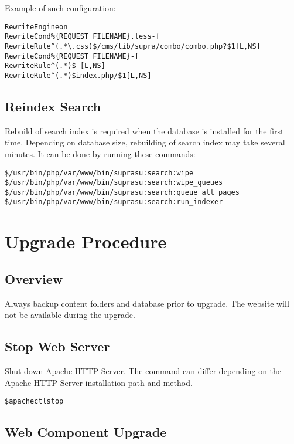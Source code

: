 \documentclass[12pt]{article}
\newcommand{\vigPathToProject}{/var/www}
\begin{document}
Example of such configuration:

\begin{alltt}
RewriteEngine on
RewriteCond \%\{REQUEST_FILENAME\}.less -f
RewriteRule ^(.*\textbackslash.css)\$ /cms/lib/supra/combo/combo.php?\$1 [L,NS]
RewriteCond \%\{REQUEST_FILENAME\} -f
RewriteRule ^(.*)\$ - [L,NS]
RewriteRule ^(.*)\$ index.php/\$1 [L,NS]
\end{alltt}

\subsection{Reindex Search\label{reindexSearch}}
Rebuild of search index is required when the database is installed for the first time. Depending on database size, rebuilding of search index may take several minutes. It can be done by running these commands:

\begin{alltt}
\$ /usr/bin/php \vigPathToProject/bin/supra su:search:wipe
\$ /usr/bin/php \vigPathToProject/bin/supra su:search:wipe_queues
\$ /usr/bin/php \vigPathToProject/bin/supra su:search:queue_all_pages
\$ /usr/bin/php \vigPathToProject/bin/supra su:search:run_indexer
\end{alltt}

\section{Upgrade Procedure}

\subsection{Overview}
Always backup content folders and database prior to upgrade. The website will not be available during the upgrade.

\subsection{Stop Web Server}
Shut down Apache HTTP Server. The command can differ depending on the Apache HTTP Server installation path and method.

\begin{alltt}
\$ apachectl stop
\end{alltt}

\subsection{Web Component Upgrade}
\end{document}
